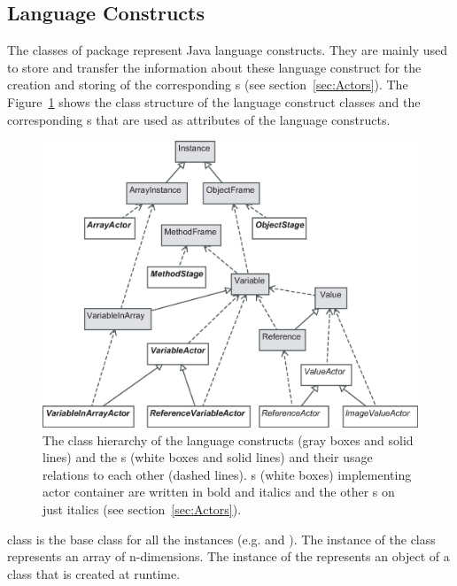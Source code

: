 \subsection{Language Constructs}
\label{sec:Language_package}

The classes of  package represent Java language constructs. They are mainly used to store and transfer the information about these language construct for the creation and storing of the corresponding s (see section~\ref{sec:Actors}). The Figure~\ref{fig:language_constructs_and_actors} shows the class structure of the language construct classes and the corresponding s that are used as attributes of the language constructs.

\begin{figure}[!htb]
\begin{center}
\includegraphics[width=\textwidth]{images/language_constructs_and_actors.eps}
\caption{The class hierarchy of the language constructs (gray boxes and solid lines) and the s (white boxes and solid lines) and their usage relations to each other (dashed lines). s (white boxes) implementing actor container are written in bold and italics and the other s on just italics (see section~\ref{sec:Actors}).}
\label{fig:language_constructs_and_actors}
\end{center}
\end{figure}

 class is the base class for all the instances (e.g.  and ).
The instance of the  class represents an array of n-dimensions. 
The instance of the  represents an object of a class that is created at runtime. 

